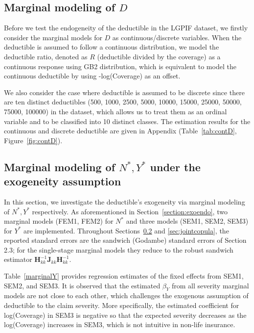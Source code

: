 \documentclass[11pt]{article}
\newcommand{\rev}[1]{{\color{blue}#1}}
\begin{document}
\subsection{Marginal modeling of $D$}\label{section:marginalD}

Before we test the endogeneity of the deductible in the LGPIF dataset, we firstly consider the marginal models for $D$ as continuous/discrete variables. When the deductible is assumed to follow a continuous distribution, we  model the deductible ratio, denoted as $R$ (deductible divided by the coverage) as a continuous response using GB2 distribution, which is equivalent to model the continuous deductible by using -log(Coverage) as an offset. 

We also consider the case where deductible is assumed to be discrete since there are ten distinct deductibles (500, 1000, 2500, 5000, 10000, 15000, 25000, 50000, 75000, 100000) in the dataset, which allows us to treat them as an ordinal variable and to be classified into 10 distinct classes. The estimation results for the continuous and \rev{discrete} deductible are given in Appendix (Table~\ref{tab:contD}, Figure~\ref{fig:contD}).



\FloatBarrier

\subsection{Marginal modeling of $N^*, Y^*$ under the exogeneity assumption}\label{section:marginalNY}

In this section, we investigate the deductible's exogeneity via marginal modeling of $N^*, Y^*$ respectively. As aforementioned in Section~\ref{section:exoendo}, two marginal models (FEM1, FEM2) for $N^*$ and three models (SEM1, SEM2, SEM3) for $Y^*$ are implemented. \rev{Throughout Sections~\ref{section:marginalNY} and \ref{sec:jointcopula}, the reported standard errors are the sandwich (Godambe) standard errors of Section 2.3; for the single-stage marginal models they reduce to the robust sandwich estimator $\bm{H}_{kk}^{-1}\bm{J}_{kk}\bm{H}_{kk}^{-1}$.}


Table~\ref{marginalY} provides regression estimates of the fixed effects from SEM1, SEM2, and SEM3. It is observed that the estimated $\beta_Y$ from all severity marginal models are not close to each other, which challenges the exogenous assumption of deductible to the claim severity. More specifically, the estimated coefficient for log(Coverage) in SEM3 is negative so that the expected severity decreases as the log(Coverage) increases in SEM3, which is not intuitive in non-life insurance.
\end{document}
